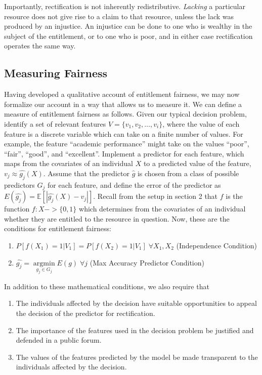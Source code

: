 Importantly, rectification is not inherently redistributive. \emph{Lacking} a 
particular resource does not give rise to a claim to that resource, unless the
lack was produced by an injustice. An injustice can be done to one who is
wealthy in the subject of the entitlement, or to one who is poor, and in either
case rectification operates the same way.

\subsection{Measuring Fairness}

Having developed a qualitative account of entitlement fairness, we may now
formalize our account in a way that allows us to measure it. We can
define a measure of entitlement fairness as follows. Given our typical decision
problem, identify a set of relevant features $V = \{v_1, v_2, \ldots, v_i\}$,
where the value of each feature is a discrete variable which can take on a
finite number of values. For example, the feature ``academic performance'' might
take on the values ``poor'', ``fair'', ``good'', and ``excellent''. Implement a
predictor for each feature, which maps from the covariates of an individual $X$
to a predicted value of the feature, $v_j \approx \hat{g_j}(X)$. Assume that the
predictor $\hat{g}$ is chosen from a class of possible predictors $G_j$ for each
feature, and define the error of the predictor as
$E(\hat{g_j}) = \mathbb{E}[|\hat{g_j}(X) - v_j|]$. Recall from the setup in section 2 that
$f$ is the function $f: X -> \{0, 1\}$ which determines from the covariates of
an individual whether they are entitled to the resource in question. Now, these
are the conditions for entitlement fairness:
\begin{enumerate}
    \item $P[f(X_1) = 1 | V_1] = P[f(X_2) = 1 | V_1]\;\forall X_1, X_2$ (Independence Condition)
    \item $\hat{g_j} = \mathop{\arg\min}\limits_{g_j\in G_j}E(g)\; \forall j$ (Max Accuracy Predictor Condition)
\end{enumerate}
In addition to these mathematical conditions, we also require that
\begin{enumerate}[start=3]
    \item The individuals affected by the decision have suitable opportunities
    to appeal the decision of the predictor for rectification.
    \item The importance of the features used in the decision problem be 
    justified and defended in a public forum. 
    \item The values of the features predicted by the model be made
    transparent to the individuals affected by the decision.
\end{enumerate}

